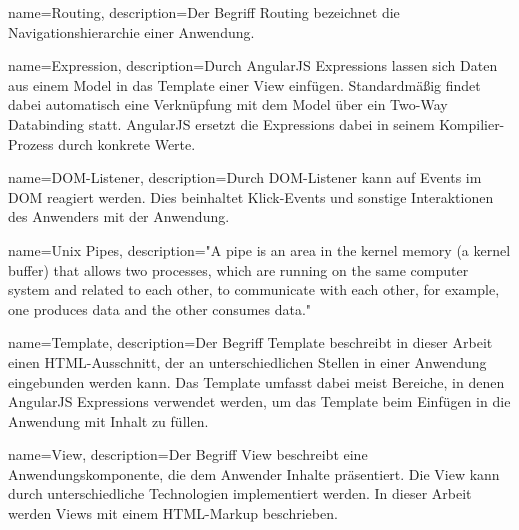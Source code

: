 {
	name=Routing,
	description={Der Begriff Routing bezeichnet die Navigationshierarchie einer Anwendung. }
}

{
	name=Expression,
	description={Durch AngularJS Expressions lassen sich Daten aus einem Model in das \gls{Template} einer View einfügen. Standardmäßig findet dabei automatisch eine Verknüpfung mit dem Model über ein Two-Way Databinding statt. AngularJS ersetzt die Expressions dabei in seinem Kompilier-Prozess durch konkrete Werte.}
}

{
	name=DOM-Listener,
	description={Durch DOM-Listener kann auf Events im DOM reagiert werden. Dies beinhaltet Klick-Events und sonstige Interaktionen des Anwenders mit der Anwendung.}
}

{
	name=Unix Pipes,
	description={"A pipe is an area in the kernel memory (a kernel buffer) that allows two
		processes, which are running on the same computer system and related to
		each other, to communicate with each other, for example, one produces data
		and the other consumes data." \cite[S. 158ff.]{Liu2011}}
}

{
	name=Template,
	description={Der Begriff Template beschreibt in dieser Arbeit einen HTML-Ausschnitt, der an unterschiedlichen Stellen in einer Anwendung eingebunden werden kann. Das Template umfasst dabei meist Bereiche, in denen AngularJS Expressions verwendet werden, um das Template beim Einfügen in die Anwendung mit Inhalt zu füllen.}
}

{
	name=View,
	description={Der Begriff View beschreibt eine Anwendungskomponente, die dem Anwender Inhalte präsentiert. Die View kann durch unterschiedliche Technologien implementiert werden. In dieser Arbeit werden Views mit einem HTML-Markup  beschrieben.}
}